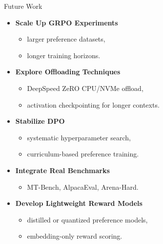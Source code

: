\documentclass[10pt]{beamer}
\begin{document}
\begin{frame}{Future Work}
\large

\begin{itemize}
    \item<1-> \textbf{Scale Up GRPO Experiments}
    \begin{itemize}
        \item larger preference datasets,
        \item longer training horizons.
    \end{itemize}

    \vspace{0.3cm}

    \item<1-> \textbf{Explore Offloading Techniques}
    \begin{itemize}
        \item DeepSpeed ZeRO CPU/NVMe offload,
        \item activation checkpointing for longer contexts.
    \end{itemize}

    \vspace{0.3cm}

    \item<1-> \textbf{Stabilize DPO}
    \begin{itemize}
        \item systematic hyperparameter search,
        \item curriculum-based preference training.
    \end{itemize}

    \vspace{0.3cm}

    \item<2-> \textbf{Integrate Real Benchmarks}
    \begin{itemize}
        \item MT-Bench, AlpacaEval, Arena-Hard.
    \end{itemize}

    \vspace{0.3cm}

    \item<2-> \textbf{Develop Lightweight Reward Models}
    \begin{itemize}
        \item distilled or quantized preference models,
        \item embedding-only reward scoring.
    \end{itemize}

\end{itemize}

\end{frame}
\end{document}
